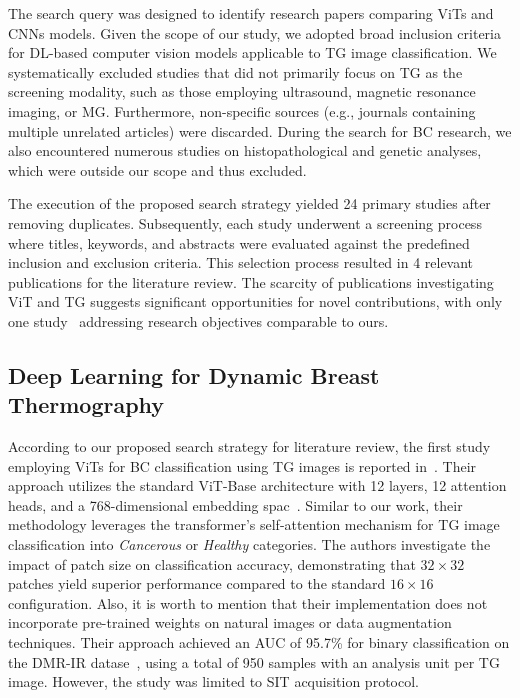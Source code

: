 \documentclass[runningheads]{llncs}
\begin{document}
The search query was designed to identify research papers comparing
\ac{ViTs} and \ac{CNNs} models. Given the scope of our study, we
adopted broad inclusion criteria for \ac{DL}-based computer vision
models applicable to \ac{TG} image classification. We systematically
excluded studies that did not primarily focus on \ac{TG} as the
screening modality, such as those employing ultrasound, magnetic
resonance imaging, or \ac{MG}. Furthermore, non-specific sources
(e.g., journals containing multiple unrelated articles) were
discarded. During the search for \ac{BC} research, we also encountered
numerous studies on histopathological and genetic analyses, which were
outside our scope and thus excluded.

The execution of the proposed search strategy yielded 24 primary
studies after removing duplicates. Subsequently, each study underwent
a screening process where titles, keywords, and abstracts were
evaluated against the predefined inclusion and exclusion
criteria. This selection process resulted in 4 relevant publications
for the literature review. The scarcity of publications investigating
\ac{ViT} and \ac{TG} suggests significant opportunities for novel
contributions, with only one study~\cite{Garia2023} addressing
research objectives comparable to ours.

\subsection{Deep Learning for Dynamic Breast Thermography}
\label{sec:related-works-1}

According to our proposed search strategy for literature review, the
first study employing \ac{ViTs} for \ac{BC} classification using
\ac{TG} images is reported in~\cite{Garia2023}. Their approach
utilizes the standard \ac{ViT}-Base architecture with 12 layers, 12
attention heads, and a 768-dimensional embedding
spac~\cite{dosovitskiy2020image}. Similar to our work, their
methodology leverages the transformer's self-attention mechanism for
\ac{TG} image classification into \textit{Cancerous} or
\textit{Healthy} categories. The authors investigate the impact of
patch size on classification accuracy, demonstrating that
$32 \times 32$ patches yield superior performance compared to the
standard $16 \times 16$ configuration. Also, it is worth to mention
that their implementation does not incorporate pre-trained weights on
natural images or data augmentation techniques. Their approach
achieved an \ac{AUC} of 95.7\% for binary classification on the DMR-IR
datase~\cite{Silva2014}, using a total of 950 samples with an analysis
unit per \ac{TG} image. However, the study was limited to \ac{SIT}
acquisition protocol.
\end{document}
